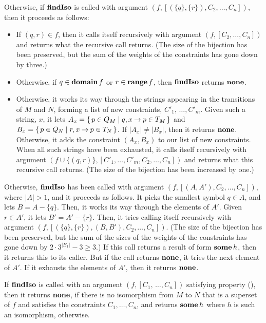 Otherwise, if $\mathbf{findIso}$ is called with argument $(f, [(\{q\},\{r\}),
C_2,\ldots,C_n])$, then it proceeds as follows:
\begin{itemize}
\item If $(q,r)\in f$, then it calls itself recursively with argument
  $(f,[C_2,\ldots,C_n])$ and returns what the recursive call returns.
  (The size of the bijection has been preserved, but the sum of the
  weights of the constraints has gone down by three.)

\item Otherwise, if $q\in\mathbf{domain}\,f$ or $r\in\mathbf{range}\,f$, then
  $\mathbf{findIso}$ returns $\mathbf{none}$.

\item Otherwise, it works its way through the strings appearing in the
  transitions of $M$ and $N$, forming a list of new constraints,
  $C'_1,\,\ldots,C'_m$.  Given such a string, $x$, it lets
  $A_x=\{ \, p\in Q_M \mid q,x\mathbin{\to} p\in T_M \, \}$ and $B_x=\{ \, p\in
    Q_N \mid r,x\mathbin{\to} p\in T_N \, \}$.  If $|A_x|\neq|B_x|$, then it returns
  $\mathbf{none}$.  Otherwise, it adds the constraint $(A_x,B_x)$ to our
  list of new constraints.  When all such strings have been exhausted,
  it calls itself recursively with argument $(f \cup \{(q,r)\},
  [C'_1,\ldots,C'_m,C_2,\ldots,C_n])$ and returns what this recursive
  call returns.  (The size of the bijection has been increased by
  one.)
\end{itemize}

Otherwise, $\mathbf{findIso}$ has been called with argument $(f, [(A, A'),
C_2, \ldots, C_n])$, where $|A|>1$, and it proceeds as follows.  It
picks the smallest symbol $q\in A$, and lets $B=A-\{q\}$.  Then,
it works its way through the elements of $A'$.  Given $r\in A'$, it
lets $B'=A'-\{r\}$.  Then, it tries calling itself recursively with
argument $(f, [(\{q\},\{r\}), (B,B'), C_2,\ldots, C_n])$.  (The
size of the bijection has been preserved, but the sum of the sizes of
the weights of the constraints has gone down by $2\cdot
3^{|B_1|}-3\geq 3$.)  If this call returns a result of form $\mathbf{some}\,h$,
then it returns this to its caller.  But if the call returns $\mathbf{none}$, it
tries the next element of $A'$.  If it exhausts the elements of $A'$,
then it returns $\mathbf{none}$.

\begin{lemma}
\label{FindIsoLem}
If $\mathbf{findIso}$ is called with an argument $(f,[C_1,\,\ldots,C_n])$ satisfying
property (\dag), then it returns $\mathbf{none}$, if there is no isomorphism
from $M$ to $N$ that is a superset of $f$ and satisfies the constraints
$C_1,\ldots,C_n$, and returns $\mathbf{some}\,h$ where $h$ is such an isomorphism,
otherwise.
\end{lemma}

